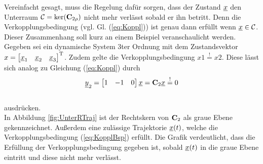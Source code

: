 Vereinfacht gesagt, muss die Regelung dafür sorgen, dass der Zustand $\underline{x}$ den Unterraum $\mathcal{C} = \textnormal{ker}(\textbf{C}_{2\rho})$ nicht mehr verlässt sobald er ihn betritt.
Denn die Verkopplungsbedingung (vgl. Gl. (\ref{eq:Koppl})) ist genau dann erfüllt wenn $\underline{x} \in \mathcal{C} $.\\
Dieser Zusammenhang soll kurz an einem Beispiel veranschaulicht werden.
Gegeben sei ein dynamische System 3ter Ordnung mit dem Zustandsvektor $x = \begin{bmatrix}
\underline{x}_{1} &\underline{x}_{2} &\underline{x}_{3} \end{bmatrix}^{\textnormal{T}}$.
Zudem gelte die Verkopplungsbedingung $x1 \stackrel{!}{=} x2$. Diese lässt sich analog zu Gleichung (\ref{eq:Koppl}) durch 
\begin{equation}\label{eq:KopplBsp}
	\underline{y}_{2} = \begin{bmatrix}
		1 &-1 &0
	\end{bmatrix} \underline{x} = \textbf{C}_{2}\underline{x} \stackrel{!}{=} 0 
\end{equation}\\
ausdrücken.\\
In Abbildung \ref{fig:UnterRTraj} ist der Rechtskern von $\textbf{C}_{2}$ als graue Ebene gekennzeichnet. Außerdem eine zulässige Trajektorie $\underline{x}(t)$, welche die Verkopplungsbedingung (\ref{eq:KopplBsp}) erfüllt. Die Grafik verdeutlicht, dass die Erfüllung der Verkopplungsbedingung gegeben ist, sobald $\underline{x}(t)$ in die graue Ebene eintritt und diese nicht mehr verlässt. 

